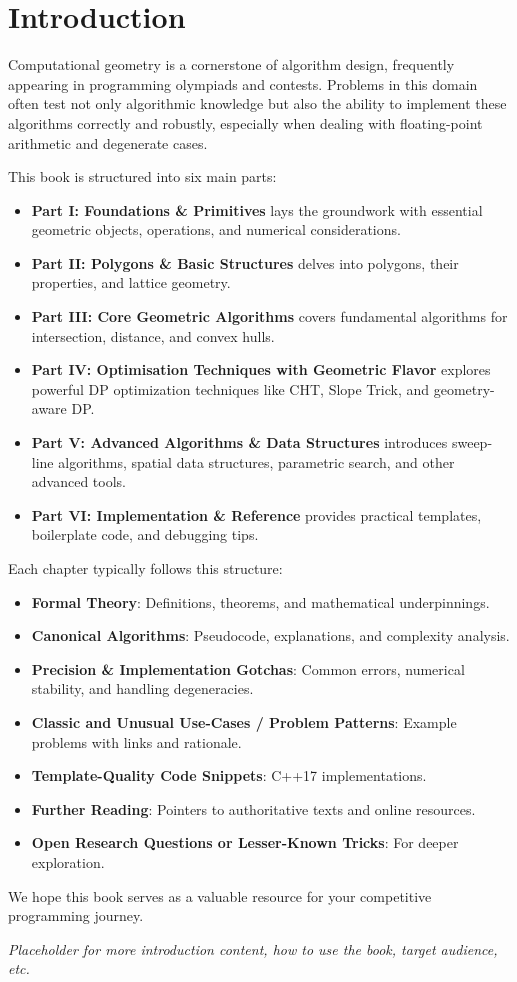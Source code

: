 \chapter*{Introduction}
\label{chap:introduction}

Computational geometry is a cornerstone of algorithm design, frequently appearing in programming olympiads and contests. Problems in this domain often test not only algorithmic knowledge but also the ability to implement these algorithms correctly and robustly, especially when dealing with floating-point arithmetic and degenerate cases.

This book is structured into six main parts:
\begin{itemize}
    \item \textbf{Part I: Foundations \& Primitives} lays the groundwork with essential geometric objects, operations, and numerical considerations.
    \item \textbf{Part II: Polygons \& Basic Structures} delves into polygons, their properties, and lattice geometry.
    \item \textbf{Part III: Core Geometric Algorithms} covers fundamental algorithms for intersection, distance, and convex hulls.
    \item \textbf{Part IV: Optimisation Techniques with Geometric Flavor} explores powerful DP optimization techniques like CHT, Slope Trick, and geometry-aware DP.
    \item \textbf{Part V: Advanced Algorithms \& Data Structures} introduces sweep-line algorithms, spatial data structures, parametric search, and other advanced tools.
    \item \textbf{Part VI: Implementation \& Reference} provides practical templates, boilerplate code, and debugging tips.
\end{itemize}

Each chapter typically follows this structure:
\begin{itemize}
    \item \textbf{Formal Theory}: Definitions, theorems, and mathematical underpinnings.
    \item \textbf{Canonical Algorithms}: Pseudocode, explanations, and complexity analysis.
    \item \textbf{Precision \& Implementation Gotchas}: Common errors, numerical stability, and handling degeneracies.
    \item \textbf{Classic and Unusual Use-Cases / Problem Patterns}: Example problems with links and rationale.
    \item \textbf{Template-Quality Code Snippets}: C++17 implementations.
    \item \textbf{Further Reading}: Pointers to authoritative texts and online resources.
    \item \textbf{Open Research Questions or Lesser-Known Tricks}: For deeper exploration.
\end{itemize}

We hope this book serves as a valuable resource for your competitive programming journey.

\textit{Placeholder for more introduction content, how to use the book, target audience, etc.}

\cleardoublepage